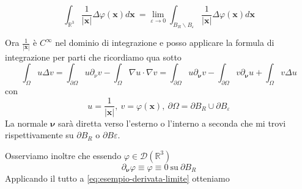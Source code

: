 \documentclass[10pt,a4paper,twoside,openright]{book}
\begin{document}
\begin{enumerate}
\begin{figure}[htpb]
\begin{tikzpicture}[x=0.75pt,y=0.75pt,yscale=-1,xscale=1]
	\end{tikzpicture}
	\end{figure}
	\FloatBarrier
	\begin{equation}
		\int _{\mathbb{R}^{3}}\frac{1}{| \mathbf{x}| } \Delta \varphi (\mathbf{x}) d\mathbf{x} \ =\lim _{\varepsilon \rightarrow 0}\int _{B_{R} \backslash B_{\varepsilon }}\frac{1}{| \mathbf{x}| } \Delta \varphi (\mathbf{x}) d\mathbf{x}
		\label{eq:esempio-derivata-limite}
	\end{equation}
\end{enumerate}

Ora $\displaystyle \frac{1}{| \mathbf{x}| }$ è $\displaystyle C^{\infty }$ nel dominio di integrazione e posso applicare la formula di integrazione per parti che ricordiamo qua sotto
\begin{equation*}
	\int _{\Omega } u\Delta v=\int _{\partial \Omega } u\partial _{\nu } v-\int _{\Omega } \nabla u\cdotp \nabla v=\int _{\partial \Omega } u\partial _{\bm{\nu }} v-\int _{\partial \Omega } v\partial _{\bm{\nu }} u+\int _{\Omega } v\Delta u
\end{equation*}
con 
\begin{equation*}
	u=\frac{1}{| \mathbf{x}| } ,\ v=\varphi (\mathbf{x}) ,\ \partial \Omega =\partial B_{R} \cup \partial B_{\varepsilon }
\end{equation*}
La normale $\displaystyle \bm{\nu }$ sarà diretta verso l'esterno o l'interno a seconda che mi trovi rispettivamente su $\displaystyle \partial B_{R}$ o $\displaystyle \partial B\varepsilon $.

Osserviamo inoltre che essendo $\displaystyle \varphi \in \mathcal{D}\left(\mathbb{R}^{3}\right)$
\begin{equation*}
	\partial _{\bm{\nu }} \varphi \equiv \varphi \equiv 0\ \text{su} \ \partial B_{R}
\end{equation*}
Applicando il tutto a \eqref{eq:esempio-derivata-limite} otteniamo
\end{document}
